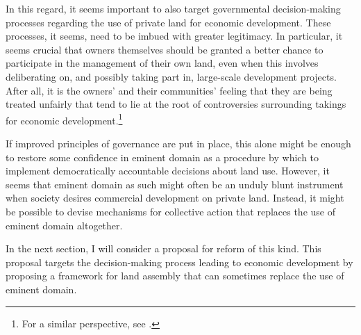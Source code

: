 In this regard, it seems important to also target governmental decision-making processes regarding the use of private land for economic development. These processes, it seems, need to be imbued with greater legitimacy. In particular, it seems crucial that owners themselves should be granted a better chance to participate in the management of their own land, even when this involves deliberating on, and possibly taking part in, large-scale development projects. After all, it is the owners' and their communities' feeling that they are being treated unfairly that tend to lie at the root of controversies surrounding takings for economic development.\footnote{For a similar perspective, see \cite{underkuffler06}.}

If improved principles of governance are put in place, this alone might be enough to restore some confidence in eminent domain as a procedure by which to implement democratically accountable decisions about land use. However, it seems that eminent domain as such might often be an unduly blunt instrument when society desires commercial development on private land. Instead, it might be possible to devise mechanisms for collective action that replaces the use of eminent domain altogether. %

In the next section, I will consider a proposal for reform of this kind. %
This proposal targets the decision-making process leading to economic development by proposing a framework for land assembly that can sometimes replace the use of eminent domain.

